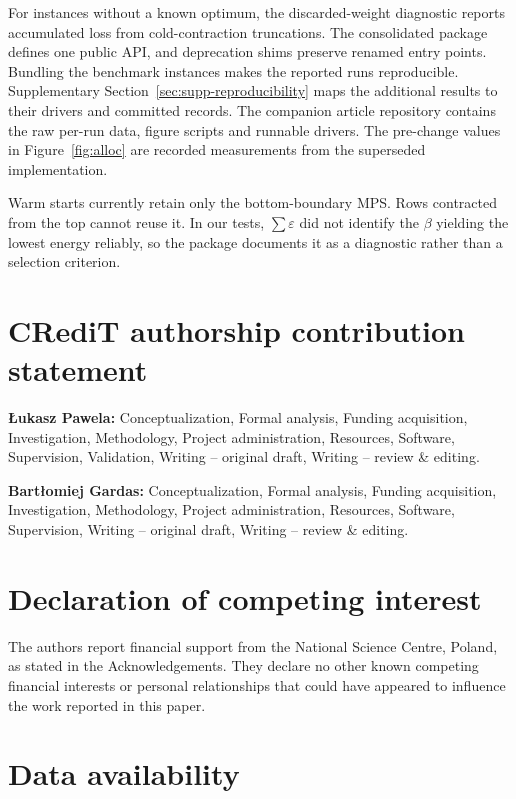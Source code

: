 \documentclass[preprint,12pt,a4paper]{elsarticle}
\begin{document}
For instances without a known optimum, the discarded-weight diagnostic reports
accumulated loss from cold-contraction truncations. The consolidated
package defines one public API, and deprecation shims preserve renamed entry
points. Bundling the benchmark instances makes the reported runs reproducible.
Supplementary Section~\ref{sec:supp-reproducibility} maps the additional results
to their drivers and committed records. The companion article repository
contains the raw per-run data, figure scripts and runnable drivers. The
pre-change values in Figure~\ref{fig:alloc} are recorded measurements from the
superseded implementation.

Warm starts currently retain only the bottom-boundary MPS. Rows contracted from
the top cannot reuse it. In our tests, $\sum\varepsilon$ did not identify the
$\beta$ yielding the lowest energy reliably, so the package documents it as a
diagnostic rather than a selection criterion.


\FloatBarrier

\section*{CRediT authorship contribution statement}

\noindent\textbf{{\L}ukasz Pawela:} Conceptualization, Formal analysis, Funding
acquisition, Investigation, Methodology, Project administration, Resources,
Software, Supervision, Validation, Writing -- original draft, Writing -- review
\& editing.

\noindent\textbf{Bart\l{}omiej Gardas:} Conceptualization, Formal analysis,
Funding acquisition, Investigation, Methodology, Project administration,
Resources, Software, Supervision, Writing -- original draft, Writing -- review
\& editing.

\section*{Declaration of competing interest}

The authors report financial support from the National Science Centre, Poland,
as stated in the Acknowledgements. They declare no other known competing
financial interests or personal relationships that could have appeared to
influence the work reported in this paper.

\section*{Data availability}
\end{document}
